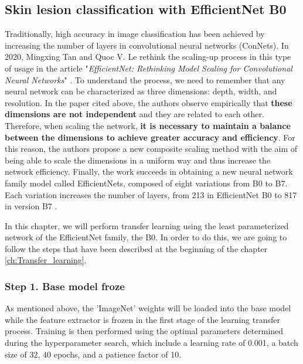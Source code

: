 \subsection{Skin lesion classification with EfficientNet B0}
Traditionally, high accuracy in image classification has been achieved by increasing the number of layers in convolutional neural networks (ConNets). In 2020, Mingxing Tan and Quoc V. Le rethink the scaling-up process in this type of usage in the article "\textit{EfficientNet: Rethinking Model Scaling for Convolutional Neural Networks}" \cite{tan_efficientnet_2020}. To understand the process, we need to remember that any neural network can be characterized as three dimensions: depth, width, and resolution. In the paper cited above, the authors observe empirically that \textbf{these dimensions are not independent} and they are related to each other. Therefore, when scaling the network, \textbf{it is necessary to maintain a balance between the dimensions to achieve greater accuracy and efficiency}. For this reason, the authors propose a new composite scaling method with the aim of being able to scale the dimensions in a uniform way and thus increase the network efficiency. Finally, the work succeeds in obtaining a new neural network family model called EfficientNets, composed of eight variations from B0 to B7. Each variation increases the number of layers, from 213 in EfficientNet B0 to 817 in version B7 \cite{medium_EfficientNet}. 

In this chapter, we will perform transfer learning using the least parameterized network of the EfficientNet family, the B0. In order to do this, we are going to follow the steps that have been described at the beginning of the chapter \ref{ch:Transfer_learning}.


\subsubsection{Step 1. Base model froze}

As mentioned above, the 'ImageNet' weights will be loaded into the base model while the feature extractor is frozen in the first stage of the learning transfer process. Training is then performed using the optimal parameters determined during the hyperparameter search, which include a learning rate of 0.001, a batch size of 32, 40 epochs, and a patience factor of 10.

